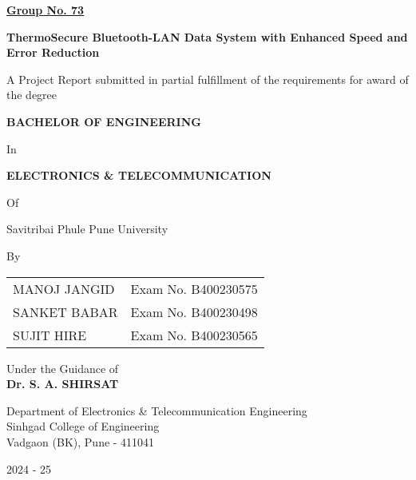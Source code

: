 \documentclass[12pt]{report}
\newcommand{\projecttitle}{ThermoSecure Bluetooth-LAN Data System with Enhanced Speed and Error Reduction}
\newcommand{\university}{Savitribai Phule Pune University}
\newcommand{\college}{Sinhgad College of Engineering}
\newcommand{\department}{Department of Electronics \& Telecommunication Engineering}
\newcommand{\location}{Vadgaon (BK), Pune - 411041}
\begin{document}
\begin{titlepage}
    \centering
    \vspace*{1cm}
    
    \underline{\textbf{Group No. 73}}\\
    \vspace{0.5cm}
    
    \textbf{\Large \projecttitle}\\
    \vspace{1.5cm}
    
    A Project Report submitted in partial fulfillment of the requirements for award of the degree\\
    \vspace{0.5cm}
    
    \textbf{BACHELOR OF ENGINEERING}\\
    \vspace{0.5cm}
    
    In\\
    \vspace{0.5cm}
    
    \textbf{ELECTRONICS \& TELECOMMUNICATION}\\
    \vspace{0.5cm}
    
    Of\\
    \vspace{0.5cm}
    
    \university\\
    \vspace{1.5cm}
    
    By\\
    \vspace{0.5cm}
    \begin{tabular}{@{}l l@{}}
        MANOJ JANGID & Exam No. B400230575 \\
        SANKET BABAR & Exam No. B400230498 \\
        SUJIT HIRE & Exam No. B400230565
    \end{tabular}
    \vspace{1.5cm}
    
    Under the Guidance of\\
    \vspace{0.5cm}
    \textbf{Dr. S. A. SHIRSAT}\\
    \vspace{1cm}
    
    \department\\
    \college\\
    \location\\
    \vspace{0.5cm}
    
    2024 - 25
\end{titlepage}
\end{document}

